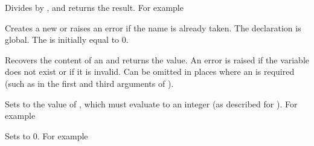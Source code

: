 \documentclass[oneside]{book}
\let\tn=\cs
\begin{document}
\begin{function}{\IntMathDiv}
\begin{syntax}
  
\end{syntax}
Divides  by ,
and returns the result. For example
\begin{demohigh}
\end{demohigh}
\end{function}

\begin{function}{\IntNew}
\begin{syntax}
 
\end{syntax}
Creates a new  or raises an error if the name is
already taken. The declaration is global. The  is
initially equal to $0$.
\end{function}

\begin{function}{\IntUse}
\begin{syntax}
 
\end{syntax}
Recovers the content of an  and returns the value.
An error is raised if the variable does
not exist or if it is invalid. Can be omitted in places where an
 is required (such as in the first and third arguments
of ).%
\end{function}

\begin{function}{\IntSet}
\begin{syntax}
  
\end{syntax}
Sets  to the value of ,
which must evaluate to an integer (as described for ).
For example
\begin{demohigh}
\IntSet{}
\IntUse\lTmpaInt
\end{demohigh}
\end{function}

\begin{function}{\IntZero}
\begin{syntax}
 
\end{syntax}
Sets  to $0$. For example
\begin{demohigh}
\IntSet{}
\IntZero\lTmpaInt
\IntUse\lTmpaInt
\end{demohigh}
\end{function}
\end{document}
